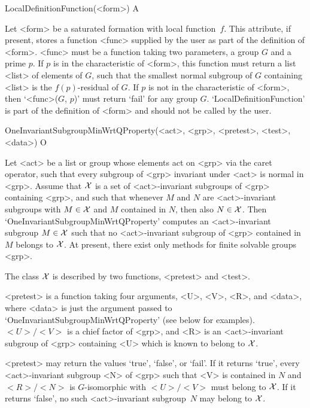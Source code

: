 \>LocalDefinitionFunction(<form>) A

Let <form> be a saturated formation with local function~$f$. This attribute,
if present, stores a function <func> supplied by the user as part of the
definition of <form>. <func> must be a function taking two parameters, a group
$G$ and a prime $p$. If $p$ is in the characteristic of <form>, this
function must return a list <list> of elements of
$G$, such that the smallest normal subgroup of $G$ containing <list> is the
$f(p)$-residual of $G$. If $p$ is not in the characteristic of <form>, 
then `<func>($G$, $p$)' must return `fail' for any group $G$.
`LocalDefinitionFunction' is part of the definition of <form> and should not
be called by the user. 


\null


\>OneInvariantSubgroupMinWrtQProperty(<act>, <grp>, <pretest>, <test>, <data>) O

Let <act> be a list or group whose elements act on <grp> via the caret operator,
such that every subgroup of <grp> invariant under <act> is normal in <grp>. 
Assume that $\cal X$ is a set of <act>-invariant subgroups of <grp> containing <grp>, and
such that whenever
$M$ and $N$ are <act>-invariant subgroups with $M \in \cal X$ and $M$
contained in $N$, then also $N \in \cal X$. Then
`OneInvariantSubgroupMinWrtQProperty' computes an <act>-invariant subgroup $M \in \cal X$
such that no <act>-invariant subgroup of <grp> contained in $M$ belongs to $\cal X$. 
At present, there exist only methods for finite solvable groups <grp>.

The class $\cal X$ is described by two functions, <pretest> and <test>. 

<pretest> is a function taking four arguments, <U>, <V>, <R>, and <data>,
where <data> is just the argument passed to
`OneInvariantSubgroupMinWrtQProperty' (see below for examples). $<U>/<V>$ is a
chief factor of <grp>, and  <R> is an <act>-invariant subgroup of <grp> containing <U>
which is known to belong to
$\cal X$.

<pretest> may return the values `true', `false', or `fail'. If it returns 
`true', every <act>-invariant subgroup <N> of <grp> such that <V> is
contained in $N$ and $<R>/<N>$ is
$G$-isomorphic with $<U>/<V>$ must belong to $\cal X$. If it returns
`false', no such <act>-invariant subgroup~$N$ may belong to $\cal X$. 

